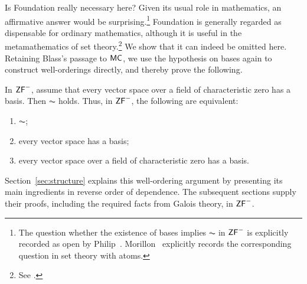 Is Foundation really necessary here? Given its usual role in
mathematics, an affirmative answer would be surprising.\footnote{The question
whether the existence of bases implies $\AC$ in $\mathsf{ZF}^{-}$ is explicitly
recorded as open by Philip~\cite[\S7.2.2, p.~121]{Philip2025}.
Morillon~\cite[p.~423]{Morillon} explicitly records the corresponding
question in set theory with atoms.} Foundation
is generally regarded as dispensable for ordinary mathematics,
although it is useful in the metamathematics of set theory.\footnote{See
\cites[Chapter~6, p.~63]{Jech2003}[p.~47 and Chapter~III, \S4]{Kunen1980}[\S I.14]{Kunen2009}[p.~87]{FraenkelBarHillelLevy1973}.}
We show that it can indeed be omitted here. Retaining Blass's passage
to $\mathsf{MC}$, we use the hypothesis on bases again to construct
well-orderings directly, and thereby prove the following.

\begin{theorem}\label{thm:main}
In $\mathsf{ZF}^{-}$, assume that every vector space over a field of characteristic
zero has a basis. Then $\AC$ holds.
Thus, in $\mathsf{ZF}^{-}$, the following are equivalent:
\begin{enumerate}
    \item $\AC$;
    \item every vector space has a basis;
    \item every vector space over a field of characteristic zero has a basis.
\end{enumerate}
\end{theorem}

Section~\ref{sec:structure} explains this well-ordering argument by
presenting its main ingredients in reverse order of dependence. The
subsequent sections supply their proofs, including the required
facts from Galois theory, in $\mathsf{ZF}^{-}$.

